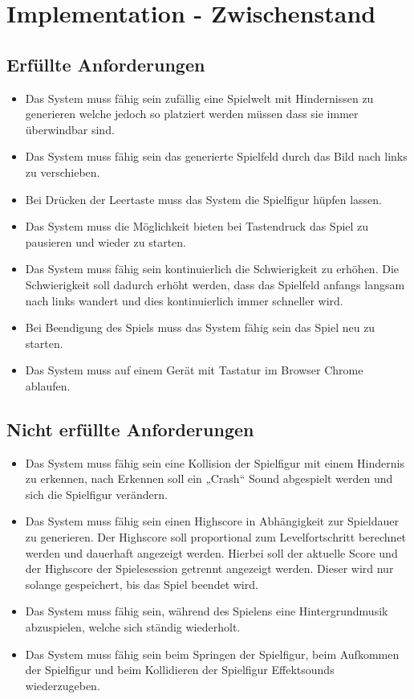 \section{Implementation - Zwischenstand}
\subsection{Erfüllte Anforderungen}
\begin{itemize}
	\item Das System muss fähig sein zufällig eine Spielwelt mit Hindernissen zu generieren welche jedoch so platziert werden müssen dass sie immer überwindbar sind.
	\item Das System muss fähig sein das generierte Spielfeld durch das Bild nach links zu verschieben.
	\item Bei Drücken der Leertaste muss das System die Spielfigur hüpfen lassen.
	\item Das System muss die Möglichkeit bieten bei Tastendruck das Spiel zu pausieren und wieder zu starten.
	\item Das System muss fähig sein kontinuierlich die Schwierigkeit zu erhöhen. Die Schwierigkeit soll dadurch erhöht werden, dass das Spielfeld anfangs langsam nach links wandert und dies kontinuierlich immer schneller wird.
	\item Bei Beendigung des Spiels muss das System fähig sein das Spiel neu zu starten. 
	\item Das System muss auf einem Gerät mit Tastatur im Browser Chrome ablaufen.
\end{itemize}

\subsection{Nicht erfüllte Anforderungen}
\begin{itemize}
	\item Das System muss fähig sein eine Kollision der Spielfigur mit einem Hindernis zu erkennen, nach Erkennen soll ein „Crash“ Sound abgespielt werden und sich die Spielfigur verändern.
	\item Das System muss fähig sein einen Highscore in Abhängigkeit zur Spieldauer zu generieren. Der Highscore soll proportional zum Levelfortschritt berechnet werden und dauerhaft angezeigt werden. Hierbei soll der aktuelle Score und der Highscore der Spielesession getrennt angezeigt werden. Dieser wird nur solange gespeichert, bis das Spiel beendet wird.
	\item Das System muss fähig sein, während des Spielens eine Hintergrundmusik abzuspielen, welche sich ständig wiederholt.
	\item Das System muss fähig sein beim Springen der Spielfigur, beim Aufkommen der Spielfigur und beim Kollidieren der Spielfigur Effektsounds   wiederzugeben.
\end{itemize}
\newpage
